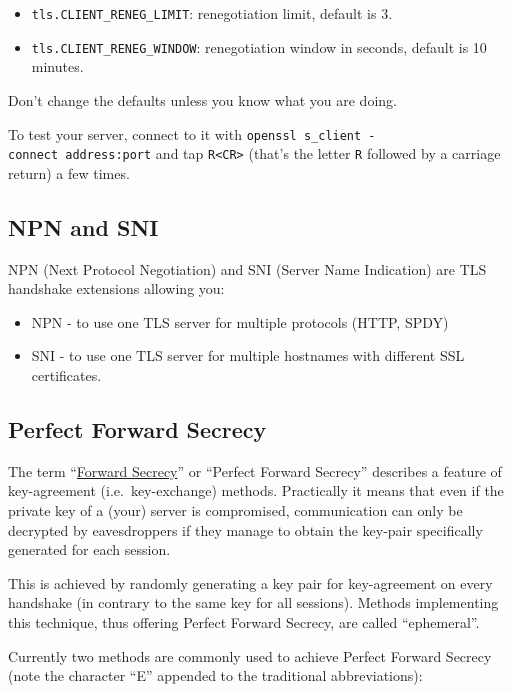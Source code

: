 \begin{itemize}
\item
  \texttt{tls.CLIENT\_RENEG\_LIMIT}: renegotiation limit, default is 3.
\item
  \texttt{tls.CLIENT\_RENEG\_WINDOW}: renegotiation window in seconds,
  default is 10 minutes.
\end{itemize}

Don't change the defaults unless you know what you are doing.

To test your server, connect to it with
\texttt{openssl\ s\_client\ -connect\ address:port} and tap
\texttt{R\textless{}CR\textgreater{}} (that's the letter \texttt{R}
followed by a carriage return) a few times.

\subsection{NPN and SNI}\label{npn-and-sni}

NPN (Next Protocol Negotiation) and SNI (Server Name Indication) are TLS
handshake extensions allowing you:

\begin{itemize}
\itemsep1pt\parskip0pt
\item
  NPN - to use one TLS server for multiple protocols (HTTP, SPDY)
\item
  SNI - to use one TLS server for multiple hostnames with different SSL
  certificates.
\end{itemize}

\subsection{Perfect Forward Secrecy}\label{perfect-forward-secrecy}

The term
``\href{http://en.wikipedia.org/wiki/Perfect_forward_secrecy}{Forward
Secrecy}'' or ``Perfect Forward Secrecy'' describes a feature of
key-agreement (i.e.~key-exchange) methods. Practically it means that
even if the private key of a (your) server is compromised, communication
can only be decrypted by eavesdroppers if they manage to obtain the
key-pair specifically generated for each session.

This is achieved by randomly generating a key pair for key-agreement on
every handshake (in contrary to the same key for all sessions). Methods
implementing this technique, thus offering Perfect Forward Secrecy, are
called ``ephemeral''.

Currently two methods are commonly used to achieve Perfect Forward
Secrecy (note the character ``E'' appended to the traditional
abbreviations):

